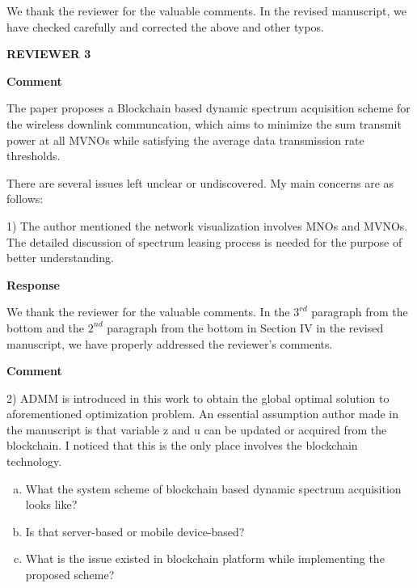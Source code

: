 \documentclass[12pt,draftcls, onecolumn]{IEEEtran}
\begin{document}
We thank the reviewer for the valuable comments. In the revised manuscript, we have checked carefully and corrected the above and other typos.

\newpage
\vspace{5mm} \noindent\textcolor[rgb]{1.00,0.00,0.00}{\textbf{REVIEWER
3}}

\vspace{3mm}
\noindent\textcolor[rgb]{1.00,0.00,0.00}{\textbf{Comment}}
\vspace{3mm}

The paper proposes a Blockchain based dynamic spectrum acquisition scheme for the wireless downlink communcation, which aims to minimize the sum transmit power at all MVNOs while satisfying the average data transmission rate thresholds.

There are several issues left unclear or undiscovered. My main concerns are as follows:

1) The author mentioned the network visualization involves MNOs and MVNOs. The detailed discussion of spectrum leasing process is needed for the purpose of better understanding.

\vspace{3mm} \noindent\textcolor[rgb]{0.00,0.00,1.00}{\textbf{Response}}
\vspace{2mm}

We thank the reviewer for the valuable comments. In the $ 3^{rd} $ paragraph from the bottom and the $ 2^{nd} $ paragraph from the bottom in Section IV in the revised manuscript, we have properly addressed the reviewer's comments.


\vspace{3mm}
\noindent\textcolor[rgb]{1.00,0.00,0.00}{\textbf{Comment}}
\vspace{3mm}

2) ADMM is introduced in this work to obtain the global optimal
solution to aforementioned optimization problem. An essential assumption author made in the manuscript is that variable z and u can be updated or acquired from the blockchain. I noticed that this is the only place involves the blockchain technology. 
\begin{enumerate}[(a)]
	\item What the system scheme of blockchain based dynamic spectrum acquisition looks like?
	\item Is that server-based or mobile device-based? 
	\item What is the issue existed in blockchain platform while implementing the proposed scheme?
\end{enumerate}
 
\end{document}

